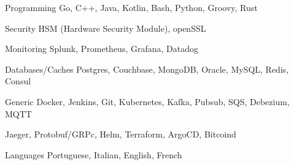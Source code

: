

\begin{cvskills}

  \cvskill
    {Programming} %
    {Go, C++, Java, Kotlin, Bash, Python, Groovy, Rust} %

  \cvskill
    {Security} %
    {HSM (Hardware Security Module), openSSL} %

  \cvskill
    {Monitoring} %
    {Splunk, Prometheus, Grafana, Datadog} %

  \cvskill
    {Databases/Caches} %
    {Postgres, Couchbase, MongoDB, Oracle, MySQL, Redis, Consul} %

  \cvskill
    {Generic} %
    {Docker, Jenkins, Git, Kubernetes, Kafka, Pubsub, SQS, Debezium, MQTT} %

  \cvskill
  {} %
  {Jaeger, Protobuf/GRPc, Helm, Terraform, ArgoCD, Bitcoind} %

  \cvskill
    {Languages} %
    {Portuguese, Italian, English, French} %


\end{cvskills}
